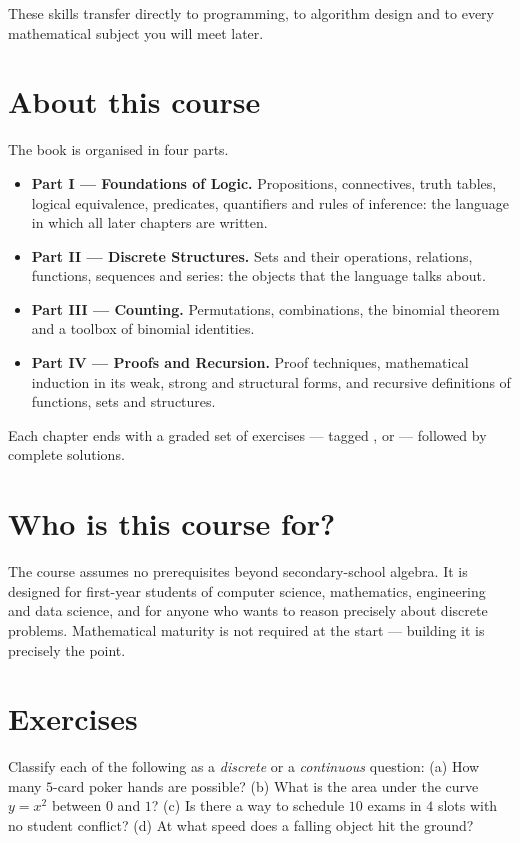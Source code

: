 These skills transfer directly to programming, to algorithm design and to every
mathematical subject you will meet later.

\section{About this course}

The book is organised in four parts.

\begin{itemize}
\item \textbf{Part I --- Foundations of Logic.} Propositions, connectives,
  truth tables, logical equivalence, predicates, quantifiers and rules of
  inference: the language in which all later chapters are written.
\item \textbf{Part II --- Discrete Structures.} Sets and their operations,
  relations, functions, sequences and series: the objects that the language
  talks about.
\item \textbf{Part III --- Counting.} Permutations, combinations, the binomial
  theorem and a toolbox of binomial identities.
\item \textbf{Part IV --- Proofs and Recursion.} Proof techniques, mathematical
  induction in its weak, strong and structural forms, and recursive
  definitions of functions, sets and structures.
\end{itemize}

Each chapter ends with a graded set of exercises --- tagged
\easy{}, \medium{} or \hard{} --- followed by complete solutions.

\section{Who is this course for?}

The course assumes no prerequisites beyond secondary-school algebra. It is
designed for first-year students of computer science, mathematics, engineering
and data science, and for anyone who wants to reason precisely about discrete
problems. Mathematical maturity is not required at the start --- building it is
precisely the point.

\section*{Exercises}

\begin{exercise}{\easy}
Classify each of the following as a \emph{discrete} or a \emph{continuous}
question: (a) How many $5$-card poker hands are possible? (b) What is the area
under the curve $y=x^2$ between $0$ and $1$? (c) Is there a way to schedule
$10$ exams in $4$ slots with no student conflict? (d) At what speed does a
falling object hit the ground?
\end{exercise}


